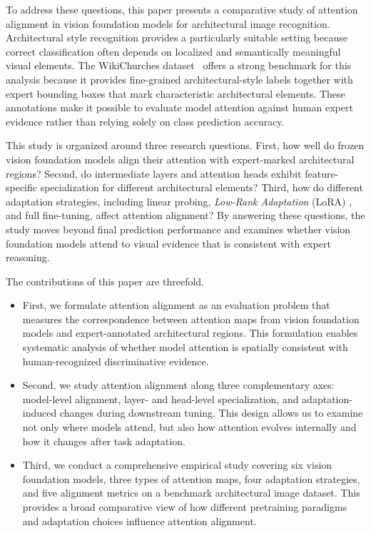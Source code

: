 \documentclass[lineno,pdflatex,sn-mathphys-num]{sn-jnl}%
\theoremstyle{thmstyleone}%
\theoremstyle{thmstyletwo}%
\theoremstyle{thmstylethree}%
\begin{document}
To address these questions, this paper presents a comparative study of attention alignment in vision foundation models for architectural image recognition. Architectural style recognition provides a particularly suitable setting because correct classification often depends on localized and semantically meaningful visual elements. The WikiChurches dataset~\cite{Barz21WikiChurches} offers a strong benchmark for this analysis because it provides fine-grained architectural-style labels together with expert bounding boxes that mark characteristic architectural elements. These annotations make it possible to evaluate model attention against human expert evidence rather than relying solely on class prediction accuracy.

This study is organized around three research questions. First, how well do frozen vision foundation models align their attention with expert-marked architectural regions? Second, do intermediate layers and attention heads exhibit feature-specific specialization for different architectural elements? Third, how do different adaptation strategies, including linear probing, \textit{Low-Rank Adaptation} (LoRA) \cite{hu2022lora}, and full fine-tuning, affect attention alignment? By answering these questions, the study moves beyond final prediction performance and examines whether vision foundation models attend to visual evidence that is consistent with expert reasoning.

The contributions of this paper are threefold.
\begin{itemize}
\item First, we formulate attention alignment as an evaluation problem that measures the correspondence between attention maps from vision foundation models and expert-annotated architectural regions. This formulation enables systematic analysis of whether model attention is spatially consistent with human-recognized discriminative evidence.
\item Second, we study attention alignment along three complementary axes: model-level alignment, layer- and head-level specialization, and adaptation-induced changes during downstream tuning. This design allows us to examine not only where models attend, but also how attention evolves internally and how it changes after task adaptation.
\item Third, we conduct a comprehensive empirical study covering six vision foundation models, three types of attention maps, four adaptation strategies, and five alignment metrics on a benchmark architectural image dataset. This provides a broad comparative view of how different pretraining paradigms and adaptation choices influence attention alignment.
\end{itemize}
\end{document}

